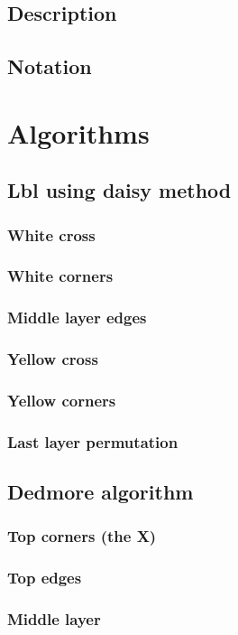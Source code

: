 \documentclass[a4paper,11pt]{kth-mag}
\begin{document}
\subsection{Description}
\subsection{Notation}
\section{Algorithms}
\subsection{Lbl using daisy method}
\subsubsection{White cross}
\subsubsection{White corners}
\subsubsection{Middle layer edges}
\subsubsection{Yellow cross}
\subsubsection{Yellow corners}
\subsubsection{Last layer permutation}
\subsection{Dedmore algorithm}
\subsubsection{Top corners (the X)}
\subsubsection{Top edges}
\subsubsection{Middle layer}
\end{document}
